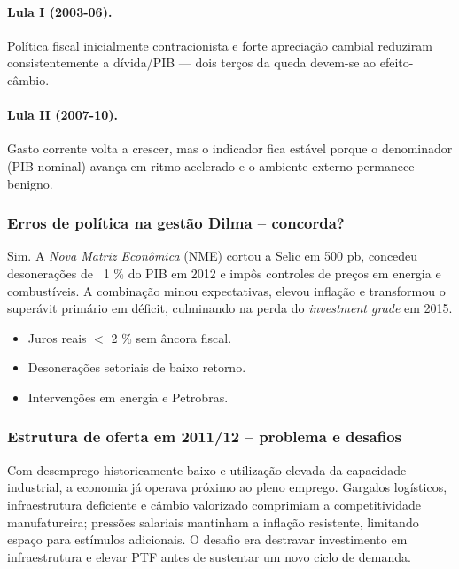 \documentclass[a4paper,12pt]{article}[abntex2]
\begin{document}
\paragraph{Lula I (2003-06).} Política fiscal inicialmente contracionista e forte apreciação cambial reduziram consistentemente a dívida/PIB — dois terços da queda devem-se ao efeito-câmbio.  

\paragraph{Lula II (2007-10).} Gasto corrente volta a crescer, mas o indicador fica estável porque o denominador (PIB nominal) avança em ritmo acelerado e o ambiente externo permanece benigno.

\subsubsection{\textbf{Erros de política na gestão Dilma – concorda?}}

Sim. A \emph{Nova Matriz Econômica} (NME) cortou a Selic em 500 pb, concedeu desonerações de ~1 \% do PIB em 2012 e impôs controles de preços em energia e combustíveis. A combinação minou expectativas, elevou inflação e transformou o superávit primário em déficit, culminando na perda do \emph{investment grade} em 2015. 

\begin{itemize}
  \item Juros reais \(<\) 2 \% sem âncora fiscal. 
  \item Desonerações setoriais de baixo retorno. 
  \item Intervenções em energia e Petrobras. 
\end{itemize}

\subsubsection{\textbf{Estrutura de oferta em 2011/12 – problema e desafios}}

Com desemprego historicamente baixo e utilização elevada da capacidade industrial, a economia já operava próximo ao pleno emprego. Gargalos logísticos, infraestrutura deficiente e câmbio valorizado comprimiam a competitividade manufatureira; pressões salariais mantinham a inflação resistente, limitando espaço para estímulos adicionais. O desafio era destravar investimento em infraestrutura e elevar PTF antes de sustentar um novo ciclo de demanda. 
\end{document}

